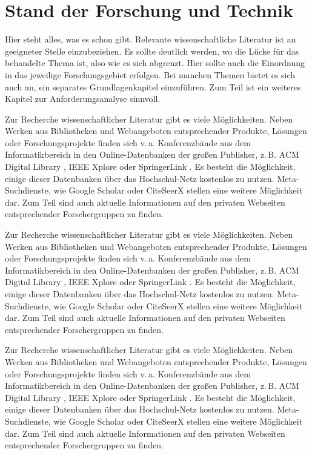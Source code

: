 \chapter{Stand der Forschung und Technik}\label{chap:sota}

Hier steht alles, was es schon gibt. Relevante wissenschaftliche Literatur ist an geeigneter Stelle einzubeziehen. Es sollte deutlich werden, wo die Lücke für das behandelte Thema ist, also wie es sich abgrenzt. Hier sollte auch die Einordnung in das jeweilige Forschungsgebiet erfolgen. Bei manchen Themen bietet es sich auch an, ein separates Grundlagenkapitel einzuführen. Zum Teil ist ein weiteres Kapitel zur Anforderungsanalyse sinnvoll.

Zur Recherche wissenschaftlicher Literatur gibt es viele Möglichkeiten. Neben Werken aus Bibliotheken und Webangeboten entsprechender Produkte, Lösungen oder Forschungsprojekte finden sich v.\,a. Konferenzbände aus dem Informatikbereich in den Online-Datenbanken der großen Publisher, z.\,B. ACM Digital Library \cite{acmdl}, IEEE Xplore \cite{ieeeexplore} oder SpringerLink \cite{springerlink}. Es besteht die Möglichkeit, einige dieser Datenbanken über das Hochschul-Netz kostenlos zu nutzen. Meta-Suchdienste, wie Google Scholar \cite{googlescholar} oder CiteSeerX \cite{citeseerx} stellen eine weitere Möglichkeit dar. Zum Teil sind auch aktuelle Informationen auf den privaten Webseiten entsprechender Forschergruppen zu finden.

Zur Recherche wissenschaftlicher Literatur gibt es viele Möglichkeiten. Neben Werken aus Bibliotheken und Webangeboten entsprechender Produkte, Lösungen oder Forschungsprojekte finden sich v.\,a. Konferenzbände aus dem Informatikbereich in den Online-Datenbanken der großen Publisher, z.\,B. ACM Digital Library \cite{acmdl}, IEEE Xplore \cite{ieeeexplore} oder SpringerLink \cite{springerlink}. Es besteht die Möglichkeit, einige dieser Datenbanken über das Hochschul-Netz kostenlos zu nutzen. Meta-Suchdienste, wie Google Scholar \cite{googlescholar} oder CiteSeerX \cite{citeseerx} stellen eine weitere Möglichkeit dar. Zum Teil sind auch aktuelle Informationen auf den privaten Webseiten entsprechender Forschergruppen zu finden.

Zur Recherche wissenschaftlicher Literatur gibt es viele Möglichkeiten. Neben Werken aus Bibliotheken und Webangeboten entsprechender Produkte, Lösungen oder Forschungsprojekte finden sich v.\,a. Konferenzbände aus dem Informatikbereich in den Online-Datenbanken der großen Publisher, z.\,B. ACM Digital Library \cite{acmdl}, IEEE Xplore \cite{ieeeexplore} oder SpringerLink \cite{springerlink}. Es besteht die Möglichkeit, einige dieser Datenbanken über das Hochschul-Netz kostenlos zu nutzen. Meta-Suchdienste, wie Google Scholar \cite{googlescholar} oder CiteSeerX \cite{citeseerx} stellen eine weitere Möglichkeit dar. Zum Teil sind auch aktuelle Informationen auf den privaten Webseiten entsprechender Forschergruppen zu finden.


